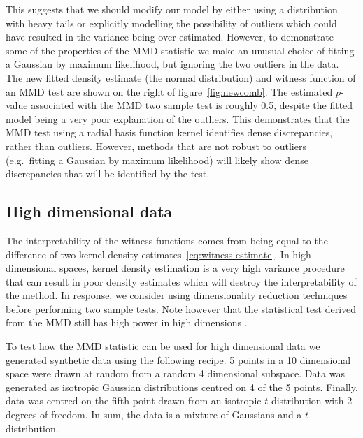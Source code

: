 \documentclass{article} %
\def\eg{e.g.\ }
\begin{document}
This suggests that we should modify our model by either using a distribution with heavy tails or explicitly modelling the possibility of outliers which could have resulted in the variance being over-estimated.
However, to demonstrate some of the properties of the MMD statistic we make an unusual choice of fitting a Gaussian by maximum likelihood, but ignoring the two outliers in the data.
The new fitted density estimate (the normal distribution) and witness function of an MMD test are shown on the right of figure~\ref{fig:newcomb}.
The estimated $p$-value associated with the MMD two sample test is roughly 0.5, despite the fitted model being a very poor explanation of the outliers.
This demonstrates that the MMD test using a radial basis function kernel identifies dense discrepancies, rather than outliers.
However, methods that are not robust to outliers (\eg fitting a Gaussian by maximum likelihood) will likely show dense discrepancies that will be identified by the test.

\subsection{High dimensional data}

\label{sec:high_dim}

The interpretability of the witness functions comes from being equal to the difference of two kernel density estimates~\eqref{eq:witness-estimate}.
In high dimensional spaces, kernel density estimation is a very high variance procedure that can result in poor density estimates which will destroy the interpretability of the method.
In response, we consider using dimensionality reduction techniques before performing two sample tests.
Note however that the statistical test derived from the MMD still has high power in high dimensions \citep{Gretton2008-ik}.

To test how the MMD statistic can be used for high dimensional data we generated synthetic data using the following recipe.
5 points in a 10 dimensional space were drawn at random from a random 4 dimensional subspace\footnotemark.
Data was generated as isotropic Gaussian distributions centred on 4 of the 5 points.
Finally, data was centred on the fifth point drawn from an isotropic $t$-distribution with 2 degrees of freedom.
In sum, the data is a mixture of Gaussians and a $t$-distribution.
\end{document}
